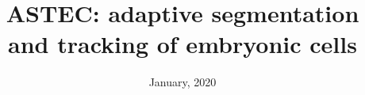 \documentclass{report}
\begin{document}
\title{ASTEC: adaptive segmentation and tracking of embryonic cells}
\author{}
\date{January, 2020}
\maketitle

\setcounter{tocdepth}{3}
\tableofcontents



% 









\end{document}
